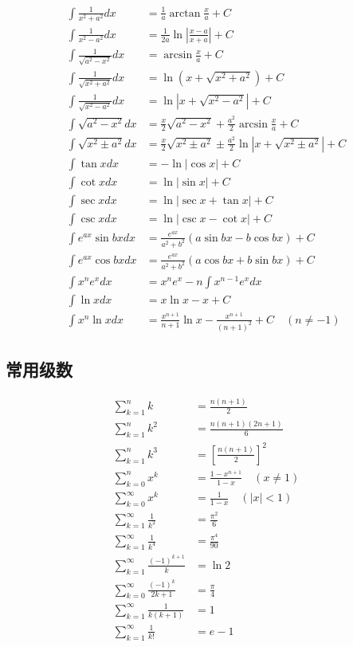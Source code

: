 \documentclass[12pt]{article}
\begin{document}
\begin{align}
\int \frac{1}{x^2 + a^2} dx &= \frac{1}{a}\arctan\frac{x}{a} + C \\
\int \frac{1}{x^2 - a^2} dx &= \frac{1}{2a}\ln\left|\frac{x-a}{x+a}\right| + C \\
\int \frac{1}{\sqrt{a^2 - x^2}} dx &= \arcsin\frac{x}{a} + C \\
\int \frac{1}{\sqrt{x^2 + a^2}} dx &= \ln(x + \sqrt{x^2 + a^2}) + C \\
\int \frac{1}{\sqrt{x^2 - a^2}} dx &= \ln|x + \sqrt{x^2 - a^2}| + C \\
\int \sqrt{a^2 - x^2} dx &= \frac{x}{2}\sqrt{a^2 - x^2} + \frac{a^2}{2}\arcsin\frac{x}{a} + C \\
\int \sqrt{x^2 \pm a^2} dx &= \frac{x}{2}\sqrt{x^2 \pm a^2} \pm \frac{a^2}{2}\ln|x + \sqrt{x^2 \pm a^2}| + C \\
\int \tan x dx &= -\ln|\cos x| + C \\
\int \cot x dx &= \ln|\sin x| + C \\
\int \sec x dx &= \ln|\sec x + \tan x| + C \\
\int \csc x dx &= \ln|\csc x - \cot x| + C \\
\int e^{ax}\sin bx dx &= \frac{e^{ax}}{a^2 + b^2}(a\sin bx - b\cos bx) + C \\
\int e^{ax}\cos bx dx &= \frac{e^{ax}}{a^2 + b^2}(a\cos bx + b\sin bx) + C \\
\int x^n e^x dx &= x^n e^x - n\int x^{n-1} e^x dx \\
\int \ln x dx &= x\ln x - x + C \\
\int x^n \ln x dx &= \frac{x^{n+1}}{n+1}\ln x - \frac{x^{n+1}}{(n+1)^2} + C \quad (n \neq -1)
\end{align}

\subsection{常用级数}

\begin{align}
\sum_{k=1}^{n} k &= \frac{n(n+1)}{2} \\
\sum_{k=1}^{n} k^2 &= \frac{n(n+1)(2n+1)}{6} \\
\sum_{k=1}^{n} k^3 &= \left[\frac{n(n+1)}{2}\right]^2 \\
\sum_{k=0}^{n} x^k &= \frac{1 - x^{n+1}}{1 - x} \quad (x \neq 1) \\
\sum_{k=0}^{\infty} x^k &= \frac{1}{1 - x} \quad (|x| < 1) \\
\sum_{k=1}^{\infty} \frac{1}{k^2} &= \frac{\pi^2}{6} \\
\sum_{k=1}^{\infty} \frac{1}{k^4} &= \frac{\pi^4}{90} \\
\sum_{k=1}^{\infty} \frac{(-1)^{k+1}}{k} &= \ln 2 \\
\sum_{k=0}^{\infty} \frac{(-1)^k}{2k+1} &= \frac{\pi}{4} \\
\sum_{k=1}^{\infty} \frac{1}{k(k+1)} &= 1 \\
\sum_{k=1}^{\infty} \frac{1}{k!} &= e - 1
\end{align}
\end{document}
